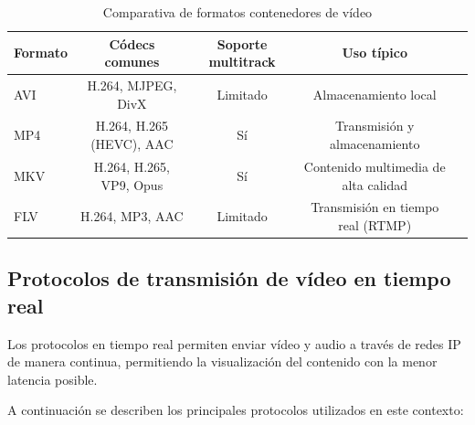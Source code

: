 \begin{table}[h]
    \centering
    \footnotesize
    \begin{tabular}{|l|c|c|c|c|}
        \hline
        \textbf{Formato} & \textbf{Códecs comunes}  & \textbf{Soporte multitrack} & \textbf{Uso típico}                  \\
        \hline
        AVI              & H.264, MJPEG, DivX       & Limitado                    & Almacenamiento local                 \\
        \hline
        MP4              & H.264, H.265 (HEVC), AAC & Sí                          & Transmisión y almacenamiento         \\
        \hline
        MKV              & H.264, H.265, VP9, Opus  & Sí                          & Contenido multimedia de alta calidad \\
        \hline
        FLV              & H.264, MP3, AAC          & Limitado                    & Transmisión en tiempo real (RTMP)    \\
        \hline
    \end{tabular}
    \caption{Comparativa de formatos contenedores de vídeo}
    \label{tab:video_containers}
\end{table}

\subsection{Protocolos de transmisión de vídeo en tiempo real}
Los protocolos en tiempo real permiten enviar vídeo y audio a través de redes IP de manera continua,
permitiendo la visualización del contenido con la menor latencia posible.

A continuación se describen los principales protocolos utilizados en este contexto:

